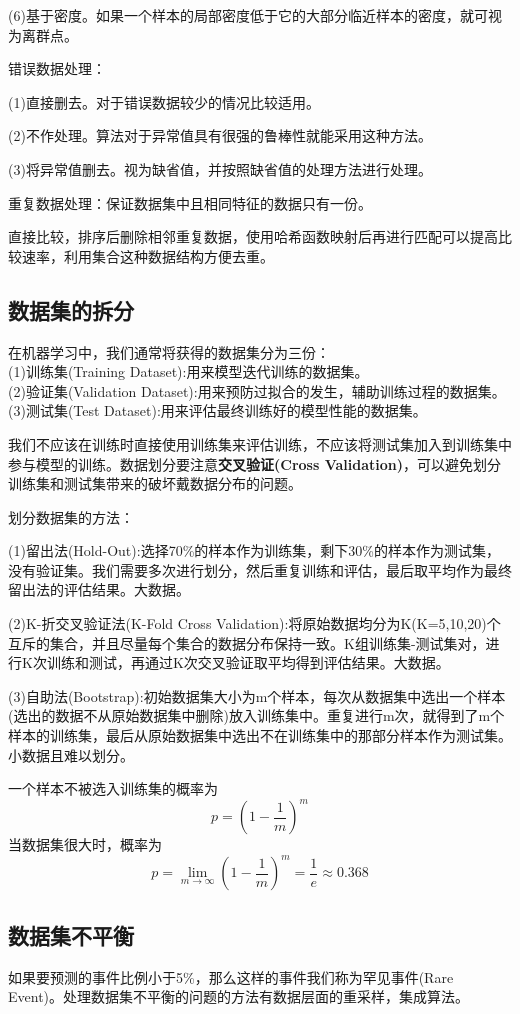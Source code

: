 \documentclass[openbib]{article}
\begin{document}
(6)基于密度。如果一个样本的局部密度低于它的大部分临近样本的密度，就可视为离群点。

错误数据处理：

(1)直接删去。对于错误数据较少的情况比较适用。

(2)不作处理。算法对于异常值具有很强的鲁棒性就能采用这种方法。

(3)将异常值删去。视为缺省值，并按照缺省值的处理方法进行处理。

重复数据处理：保证数据集中且相同特征的数据只有一份。

直接比较，排序后删除相邻重复数据，使用哈希函数映射后再进行匹配可以提高比较速率，利用集合这种数据结构方便去重。

\subsection{数据集的拆分}
在机器学习中，我们通常将获得的数据集分为三份：
\\(1)训练集(Training Dataset):用来模型迭代训练的数据集。
\\(2)验证集(Validation Dataset):用来预防过拟合的发生，辅助训练过程的数据集。
\\(3)测试集(Test Dataset):用来评估最终训练好的模型性能的数据集。

我们不应该在训练时直接使用训练集来评估训练，不应该将测试集加入到训练集中参与模型的训练。数据划分要注意\textbf{交叉验证(Cross Validation)}，可以避免划分训练集和测试集带来的破坏戴数据分布的问题。

划分数据集的方法：

(1)留出法(Hold-Out):选择70\%的样本作为训练集，剩下30\%的样本作为测试集，没有验证集。我们需要多次进行划分，然后重复训练和评估，最后取平均作为最终留出法的评估结果。大数据。

(2)K-折交叉验证法(K-Fold Cross Validation):将原始数据均分为K(K=5,10,20)个互斥的集合，并且尽量每个集合的数据分布保持一致。K组训练集-测试集对，进行K次训练和测试，再通过K次交叉验证取平均得到评估结果。大数据。

(3)自助法(Bootstrap):初始数据集大小为m个样本，每次从数据集中选出一个样本(选出的数据不从原始数据集中删除)放入训练集中。重复进行m次，就得到了m个样本的训练集，最后从原始数据集中选出不在训练集中的那部分样本作为测试集。小数据且难以划分。

一个样本不被选入训练集的概率为$$p=(1-\frac{1}{m})^m$$
当数据集很大时，概率为$$p=\lim_{m \to \infty}(1-\frac{1}{m} )^m=\frac{1}{e}\approx 0.368 $$
\subsection{数据集不平衡}
如果要预测的事件比例小于5\%，那么这样的事件我们称为罕见事件(Rare Event)。处理数据集不平衡的问题的方法有数据层面的重采样，集成算法。
\end{document}
